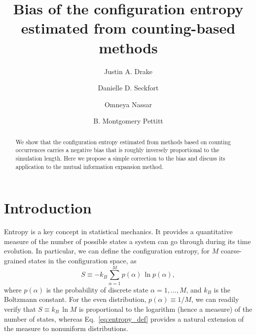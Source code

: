 \documentclass[reprint, superscriptaddress]{revtex4-1}
\begin{document}
\title{Bias of the configuration entropy estimated from counting-based methods}

\author{Justin A. Drake}
\author{Danielle D. Seckfort}
\author{Omneya Nassar}
\author{B. Montgomery Pettitt}

\begin{abstract}
We show that the configuration entropy estimated from methods based on counting occurrences
carries a negative bias
that is roughly inversely proportional to the simulation length.
%
Here we propose a simple correction to the bias
and discuss its application to the mutual information expansion method.
\end{abstract}

\maketitle


\section{Introduction}

Entropy is a key concept in statistical mechanics.
%
It provides a quantitative measure of
the number of possible states a system can go through during its time evolution.
%
In particular, we can define the configuration entropy,
for $M$ coarse-grained states in the configuration space, as
%
\begin{equation}
  S
  \equiv
  -k_B \sum_{\alpha = 1}^M p(\alpha) \, \ln p(\alpha)
  ,
  \label{eq:entropy_def}
\end{equation}
%
where $p(\alpha)$ is the probability of discrete state $\alpha = 1, \dots, M$,
and $k_B$ is the Boltzmann constant.
%
For the even distribution, $p(\alpha) \equiv 1/M$,
we can readily verify that $S \equiv k_B \, \ln M$
is proportional to the logarithm (hence a measure) of the number of states,
whereas Eq.~\eqref{eq:entropy_def}
provides a natural extension of the measure to nonuniform distributions.
\end{document}
